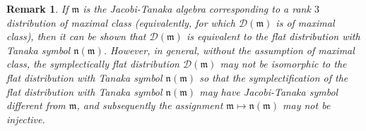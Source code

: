 \documentclass[11pt,letterpaper]{amsart}
\newcommand{\IZ}[1]{\todo[inline,color=red!40]{#1}}  %
\newcommand{\tr}{\textcolor{red}}
\newtheorem{remark}[theorem]{Remark}
\numberwithin{equation}{section}
\begin{document}
\begin{remark}
If $\mathfrak{m}$ is the Jacobi-Tanaka algebra corresponding to a rank $3$ distribution of maximal class (equivalently, for which $\mathcal{D}(\mathfrak{m})$ is of maximal class), then it can be shown \cite{doubrov2008rank3, doubrov2016JacobiCurves} that $\mathcal{D}(\mathfrak{m})$ is equivalent to the flat distribution with Tanaka symbol $\mathfrak{n}(\mathfrak{m})$. However, in general, without the assumption of maximal class, the symplectically flat distribution $\mathcal{D}(\mathfrak{m})$ may not be isomorphic to the flat distribution with Tanaka symbol $\mathfrak{n}(\mathfrak{m})$ so that the symplectification of the flat distribution with Tanaka symbol $\mathfrak n(\mathfrak m)$ may have Jacobi-Tanaka symbol different from $\mathfrak m$, and subsequently the assignment $\mathfrak{m} \mapsto \mathfrak{n}(\mathfrak{m})$ may not be injective. 
\end{remark}



\end{document}
